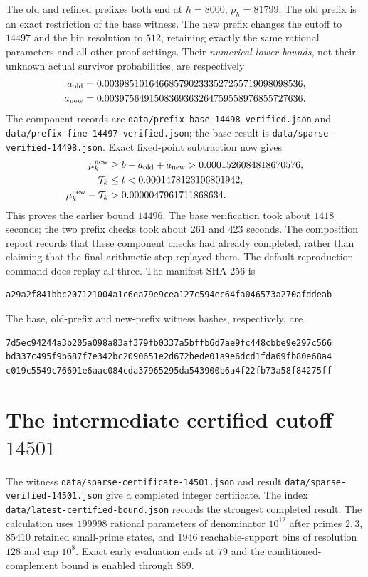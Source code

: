 \documentclass[11pt]{article}
\begin{document}
The old and refined prefixes both end at $h=8000$, $p_h=81799$.
The old prefix is an exact restriction of the base witness. The new prefix
changes the cutoff to $14497$ and the bin resolution to $512$, retaining
exactly the same rational parameters and all other proof settings.
Their \emph{numerical lower bounds}, not their unknown actual survivor
probabilities, are respectively
\begin{align*}
 a_{\rm old}&=0.0039851016466857902333527255719098098536,\\
 a_{\rm new}&=0.0039756491508369363264759558976855727636.
\end{align*}
The component records are \texttt{data/prefix-base-14498-verified.json}
and \texttt{data/prefix-fine-14497-verified.json}; the base result is
\texttt{data/sparse-verified-14498.json}.
Exact fixed-point subtraction now gives
\begin{align*}
 \mu_k^{\rm new}&\geq b-a_{\rm old}+a_{\rm new}
                   >0.0001526084818670576,\\
 \mathcal T_k&\leq t<0.0001478123106801942,\\
 \mu_k^{\rm new}-\mathcal T_k
       &>0.0000047961711868634.
\end{align*}
This proves the earlier bound $14496$. The base verification took about
$1418$ seconds; the two prefix checks took about $261$ and $423$ seconds.
The composition report records that these component checks had already
completed, rather than claiming that the final arithmetic step replayed
them. The default reproduction command does replay all three.
The manifest SHA-256 is
\begin{lstlisting}[basicstyle=\ttfamily\scriptsize,breaklines=true]
a29a2f841bbc207121004a1c6ea79e9cea127c594ec64fa046573a270afddeab
\end{lstlisting}
The base, old-prefix and new-prefix witness hashes, respectively, are
\begin{lstlisting}[basicstyle=\ttfamily\scriptsize,breaklines=true]
7d5ec94244a3b205a098a83af379fb0337a5bffb6d7ae9fc448cbbe9e297c566
bd337c495f9b687f7e342bc2090651e2d672bede01a9e6dcd1fda69fb80e68a4
c019c5549c76691e6aac084cda37965295da543900b6a4f22fb73a58f84275ff
\end{lstlisting}

\section{The intermediate certified cutoff $14501$}\label{sec:14501}
The witness \texttt{data/sparse-certificate-14501.json} and result
\texttt{data/sparse-verified-14501.json} give a completed integer
certificate. The index \texttt{data/latest-certified-bound.json}
records the strongest completed result. The calculation uses $199998$
rational parameters of denominator $10^{12}$ after primes $2,3$,
$85410$ retained small-prime states, and $1946$ reachable-support bins
of resolution $128$ and cap $10^8$. Exact early evaluation ends at $79$
and the conditioned-complement bound is enabled through $859$.
\end{document}
